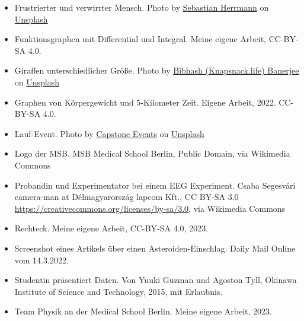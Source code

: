 \documentclass{beamer}
\begin{document}
\begin{frame}
\begin{tiny}
\begin{itemize}
\item
Frustrierter und verwirrter Mensch. Photo by \href{https://unsplash.com/@officestock?utm_source=unsplash&utm_medium=referral&utm_content=creditCopyText}{Sebastian Herrmann} on \href{https://unsplash.com/s/photos/frustration?utm_source=unsplash&utm_medium=referral&utm_content=creditCopyText}{Unsplash}

\item
Funktionsgraphen mit Differential und Integral. Meine eigene Arbeit, CC-BY-SA 4.0.


\item
Giraffen unterschiedlicher Größe. Photo by \href{https://unsplash.com/@perventuator?utm_source=unsplash&utm_medium=referral&utm_content=creditCopyText}{Bibhash (Knapsnack.life) Banerjee} on \href{https://unsplash.com/s/photos/giraffe?utm_source=unsplash&utm_medium=referral&utm_content=creditCopyText}{Unsplash}
  


\item
Graphen von Körpergewicht und 5-Kilometer Zeit. Eigene Arbeit, 2022. CC-BY-SA 4.0.

  \item
Lauf-Event. Photo by \href{https://unsplash.com/@capstoneeventgroup?utm_source=unsplash&utm_medium=referral&utm_content=creditCopyText}{Capstone Events} on \href{https://unsplash.com/s/photos/marathon?utm_source=unsplash&utm_medium=referral&utm_content=creditCopyText}{Unsplash}

\item
Logo der MSB. MSB Medical School Berlin, Public Domain, via Wikimedia Commons


\item
Probandin und Experimentator bei einem EEG Experiment. Csaba Segesvári camera-man at Délmagyarország lapcom Kft., CC BY-SA 3.0 \url{https://creativecommons.org/licenses/by-sa/3.0}, via Wikimedia Commons

\item 
Rechteck. Meine eigene Arbeit, CC-BY-SA 4.0, 2023.

\item
Screenshot eines Artikels über einen Asteroiden-Einschlag. Daily Mail Online vom 14.3.2022.

\item
Studentin präsentiert Daten. Von Yuuki Guzman und Agoston Tyll, Okinawa Institute of Science and Technology, 2015, mit Erlaubnis. 

\item
Team Physik an der Medical School Berlin. Meine eigene Arbeit, 2023.


\end{itemize}
\end{tiny}
\end{frame}
\end{document}
